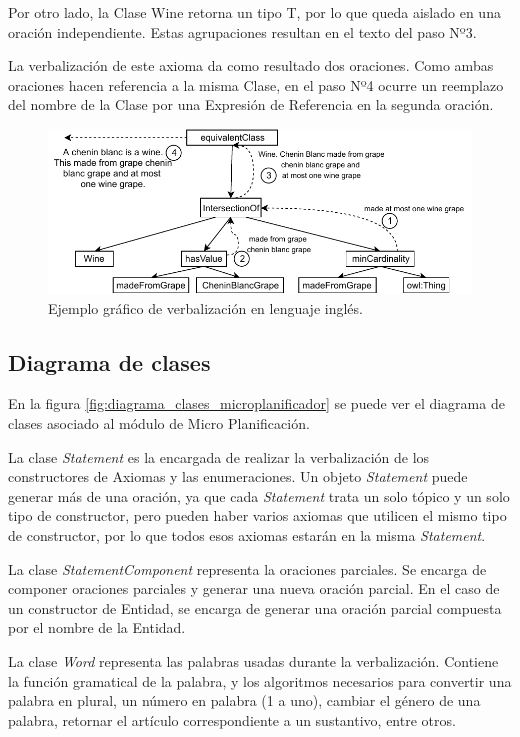 Por otro lado, la Clase Wine retorna un tipo T, por lo que queda aislado en una oración independiente. Estas agrupaciones resultan en el texto del paso Nº3.

La verbalización de este axioma da como resultado dos oraciones. Como ambas oraciones hacen referencia a la misma Clase, en el paso Nº4 ocurre un reemplazo del nombre de la Clase por una Expresión de Referencia en la segunda oración. 

\begin{figure}
    \centering
    \includegraphics[width=\textwidth]{img/generacion_documento/verbalizacion_equivalentClass_english.pdf}
    \caption{Ejemplo gráfico de verbalización en lenguaje inglés.}
    \label{fig:ejemplo_verb_ingles}
\end{figure}

\subsection{Diagrama de clases}
En la figura \ref{fig:diagrama_clases_microplanificador} se puede ver el diagrama de clases asociado al módulo de Micro Planificación. 

La clase \emph{Statement} es la encargada de realizar la verbalización de los constructores de Axiomas y las enumeraciones. Un objeto \emph{Statement} puede generar más de una oración, ya que cada \emph{Statement} trata un solo tópico y un solo tipo de constructor, pero pueden haber varios axiomas que utilicen el mismo tipo de constructor, por lo que todos esos axiomas estarán en la misma \emph{Statement}.

La clase \emph{StatementComponent} representa la oraciones parciales. Se encarga de componer oraciones parciales y generar una nueva oración parcial. En el caso de un constructor de Entidad, se encarga de generar una oración parcial compuesta por el nombre de la Entidad.

La clase \emph{Word} representa las palabras usadas durante la verbalización. Contiene la función gramatical de la palabra, y los algoritmos necesarios para convertir una palabra en plural, un número en palabra (1 a uno), cambiar el género de una palabra, retornar el artículo correspondiente a un sustantivo, entre otros.


